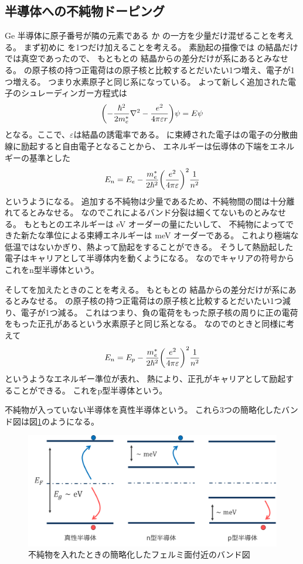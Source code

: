 \documentclass[11pt,dvipdfmx,a4paper]{jsarticle}
\numberwithin{equation}{section}
\begin{document}
\subsection{半導体への不純物ドーピング}
Ge 半導体に原子番号が隣の元素である  か  の一方を少量だけ混ぜることを考える。
まず初めに  を1つだけ加えることを考える。
素励起の描像では  の結晶だけでは真空であったので、
もともとの  結晶からの差分だけが系にあるとみなせる。
 の原子核の持つ正電荷はの原子核と比較するとだいたい1つ増え、電子が1つ増える。
つまり水素原子と同じ系になっている。
よって新しく追加された電子のシュレーディンガー方程式は
\begin{equation}
	\qty(-\frac{\hbar^2}{2m_e^*}\laplacian - \frac{e^2}{4\pi\varepsilon r})\psi = E \psi
\end{equation}
となる。ここで、\(\varepsilon\)は結晶の誘電率である。
 に束縛された電子はの電子の分散曲線に励起すると自由電子となることから、
エネルギーは伝導体の下端をエネルギーの基準とした
\begin{equation}
	E_n = E_e - \frac{m_e^*}{2\hbar^2}\qty(\frac{e^2}{4\pi \varepsilon})^2\frac{1}{n^2}
\end{equation}
というようになる。
追加する不純物は少量であるため、不純物間の間は十分離れてるとみなせる。
なのでこれによるバンド分裂は細くてないものとみなせる。
もともとのエネルギーは eV オーダーの量にたいして、
不純物によってできた新たな準位による束縛エネルギーは meV オーダーである。
これより極端な低温ではないかぎり、熱よって励起をすることができる。
そうして熱励起した電子はキャリアとして半導体内を動くようになる。
なのでキャリアの符号からこれをn型半導体という。

そしてを加えたときのことを考える。
もともとの  結晶からの差分だけが系にあるとみなせる。
 の原子核の持つ正電荷はの原子核と比較するとだいたい1つ減り、電子が1つ減る。
これはつまり、負の電荷をもった原子核の周りに正の電荷をもった正孔があるという水素原子と同じ系となる。
なのでのときと同様に考えて
\begin{equation}
	E_n = E_p - \frac{m_e^*}{2\hbar^2}\qty(\frac{e^2}{4\pi \varepsilon})^2\frac{1}{n^2}
\end{equation}
というようなエネルギー準位が表れ、
熱により、正孔がキャリアとして励起することができる。
これをp型半導体という。

不純物が入っていない半導体を真性半導体という。
これら3つの簡略化したバンド図は図\ref{fig:01}のようになる。 %
\begin{figure}[h]
	\centering
	\includegraphics[width=0.65\columnwidth]{fig/fig01.png}
	\caption{不純物を入れたときの簡略化したフェルミ面付近のバンド図}
	\label{fig:01}
\end{figure}
\end{document}
